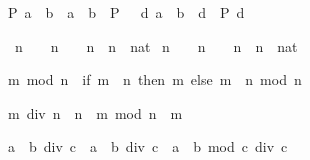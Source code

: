 \begin{isabellebody}
\begin{isamarkuptext}
\begin{isabelle}%
P\ {\isacharparenleft}a\ {\isacharminus}\ b{\isacharparenright}\ {\isacharequal}\ {\isacharparenleft}{\isacharparenleft}a\ {\isacharless}\ b\ {\isasymlongrightarrow}\ P\ {}{\isacharparenright}\ {\isasymand}\ {\isacharparenleft}{\isasymforall}d{\isachardot}\ a\ {\isacharequal}\ b\ {\isacharplus}\ d\ {\isasymlongrightarrow}\ P\ d{\isacharparenright}{\isacharparenright}%
\end{isabelle}
%
\end{isamarkuptext}%
\isamarkuptrue%
\ {\isachardoublequote}{\isacharparenleft}n\ {\isacharminus}\ {}{\isacharparenright}\ {\isacharasterisk}\ {\isacharparenleft}n\ {\isacharplus}\ {}{\isacharparenright}\ {\isacharequal}\ n\ {\isacharasterisk}\ n\ {\isacharminus}\ {\isacharparenleft}{}{\isacharcolon}{\isacharcolon}nat{\isacharparenright}{\isachardoublequote}\isanewline
\isamarkupfalse%
\isamarkupfalse%
\isamarkupfalse%
\isanewline
\isanewline
\isanewline
\isamarkupfalse%
\ {\isachardoublequote}{\isacharparenleft}n\ {\isacharminus}\ {}{\isacharparenright}\ {\isacharasterisk}\ {\isacharparenleft}n\ {\isacharplus}\ {}{\isacharparenright}\ {\isacharequal}\ n\ {\isacharasterisk}\ n\ {\isacharminus}\ {\isacharparenleft}{}{\isacharcolon}{\isacharcolon}nat{\isacharparenright}{\isachardoublequote}\isanewline
\isamarkupfalse%
\isamarkupfalse%
\isamarkupfalse%
\isamarkupfalse%
%
\begin{isamarkuptext}%
\begin{isabelle}%
m\ mod\ n\ {\isacharequal}\ {\isacharparenleft}if\ m\ {\isacharless}\ n\ then\ m\ else\ {\isacharparenleft}m\ {\isacharminus}\ n{\isacharparenright}\ mod\ n{\isacharparenright}%
\end{isabelle}

\begin{isabelle}%
m\ div\ n\ {\isacharasterisk}\ n\ {\isacharplus}\ m\ mod\ n\ {\isacharequal}\ m%
\end{isabelle}


\begin{isabelle}%
a\ {\isacharasterisk}\ b\ div\ c\ {\isacharequal}\ a\ {\isacharasterisk}\ {\isacharparenleft}b\ div\ c{\isacharparenright}\ {\isacharplus}\ a\ {\isacharasterisk}\ {\isacharparenleft}b\ mod\ c{\isacharparenright}\ div\ c%
\end{isabelle}


\end{isamarkuptext}
\end{isabellebody}
